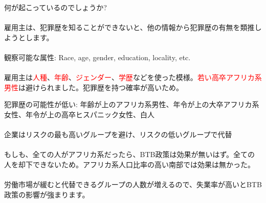\begin{frame}{}
何が起こっているのでしょうか?\\~\\
\pause
雇用主は、犯罪歴を知ることができないと、他の情報から犯罪歴の有無を類推しようとします。\\~\\

\pause
観察可能な属性: Race, age, gender, education, locality, etc.\\~\\

\pause
雇用主は\textcolor<5>{red}{人種}、\textcolor<6>{red}{年齢}、\textcolor<7>{red}{ジェンダー}、\textcolor<8>{red}{学歴}などを使った模様。\textcolor<6>{red}{若い}\textcolor<8>{red}{高卒}\textcolor<5>{red}{アフリカ系}\textcolor<7>{red}{男性}は避けられました。犯罪歴を持つ確率が高いため。

\begin{description}
\vspace{1.0ex}\setlength{\itemsep}{1.0ex}\setlength{\baselineskip}{12pt}
\end{description}
\end{frame}

\begin{frame}{}
犯罪歴の可能性が低い: 年齢が上のアフリカ系男性、年令が上の大卒アフリカ系女性、年令が上の高卒ヒスパニック女性、白人\\~\\

\pause
企業はリスクの最も高いグループを避け、リスクの低いグループで代替\\~\\

\pause
もしも、全ての人がアフリカ系だったら、BTB政策は効果が無いはず。全ての人を却下できないため。アフリカ系人口比率の高い南部では効果は無かった。\\~\\

\pause
労働市場が緩むと代替できるグループの人数が増えるので、失業率が高いとBTB政策の影響が強まります。
\end{frame}


